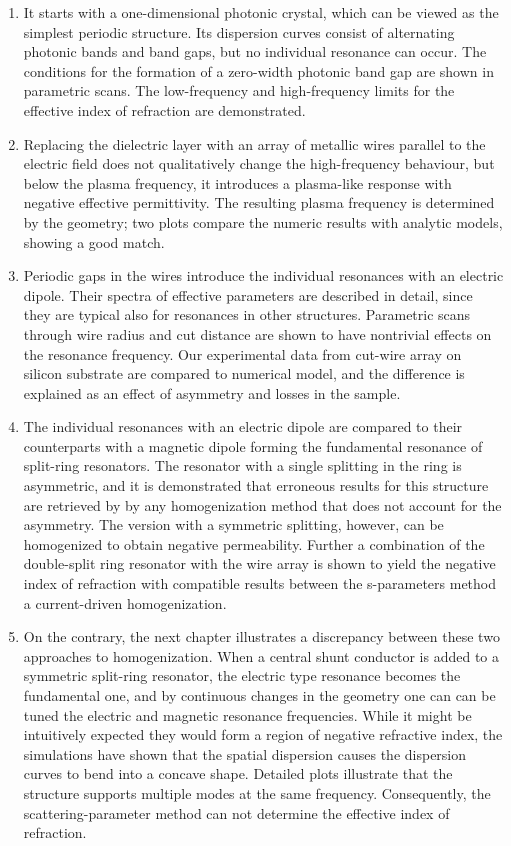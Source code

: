 \begin{enumerate}
\item{It starts with a one-dimensional photonic crystal, which can be viewed as the simplest periodic structure. Its dispersion curves consist of alternating photonic bands and band gaps, but no individual resonance can occur. The conditions for the formation of a zero-width photonic band gap are shown in parametric scans. The low-frequency and high-frequency limits for the effective index of refraction are demonstrated.
} 
\item{Replacing the dielectric layer with an array of metallic wires parallel to the electric field does not qualitatively change the high-frequency behaviour, but below the plasma frequency, it introduces a plasma-like response with negative effective permittivity. The resulting plasma frequency is determined by the geometry; two plots compare the numeric results with analytic models, showing a good match.
} 
\item{Periodic gaps in the wires introduce the individual resonances with an electric dipole. Their spectra of  effective parameters are described in detail, since they are typical also for resonances in other structures. Parametric scans through wire radius and cut distance are shown to have nontrivial effects on the resonance frequency. Our experimental data from cut-wire array on silicon substrate are compared to numerical model, and the difference is explained as an effect of asymmetry and losses in the sample. 
} 
\item{The individual resonances with an electric dipole are compared to their counterparts with a magnetic dipole forming the fundamental resonance of split-ring resonators. The resonator with a single splitting in the ring is asymmetric, and it is demonstrated that  erroneous results for this structure are retrieved by by any homogenization method that does not account for the asymmetry. The version with a symmetric splitting, however, can be homogenized to obtain negative permeability. Further a combination of the double-split ring resonator with the wire array is shown to yield the negative index of refraction with compatible results between the s-parameters method a current-driven homogenization.
} 
\item{On the contrary, the next chapter illustrates a discrepancy between these two approaches to homogenization. When a central shunt conductor is added to a symmetric split-ring resonator, the electric type resonance becomes the fundamental one, and by continuous changes in the geometry one can  can be tuned the electric and magnetic resonance frequencies. While it might be intuitively expected they would form a region of negative refractive index, the simulations have shown that the spatial dispersion causes the dispersion curves to bend into a concave shape. Detailed plots illustrate that the structure supports multiple modes at the same frequency. Consequently, the scattering-parameter method can not determine the effective index of refraction.
}
\end{enumerate}
